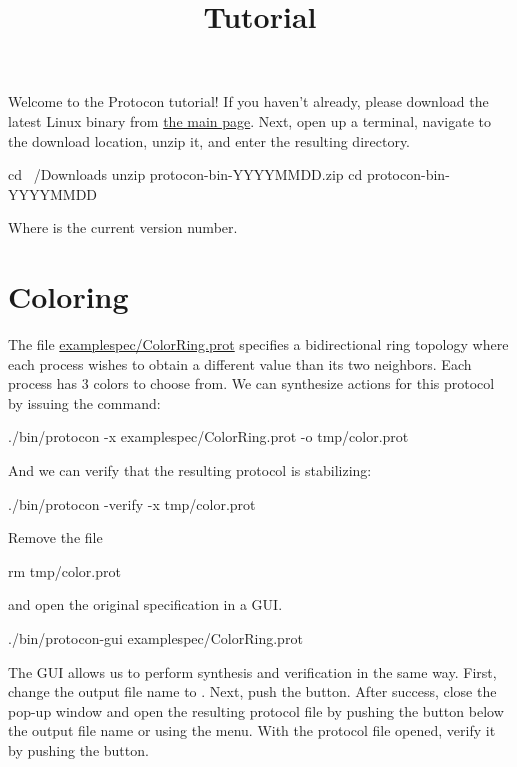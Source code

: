 
\title{Tutorial}
\date{}



Welcome to the Protocon tutorial!
If you haven't already, please download the latest Linux binary from \href{index.html}{the main page}.
Next, open up a terminal, navigate to the download location, unzip it, and enter the resulting directory.
\begin{code}
cd ~/Downloads
unzip protocon-bin-YYYYMMDD.zip
cd protocon-bin-YYYYMMDD
\end{code}
Where  is the current version number.


\tableofcontents


\section{Coloring}

The file \href{\examplespec/ColorRing.prot}{examplespec/ColorRing.prot} specifies a bidirectional ring topology where each process wishes to obtain a different value than its two neighbors.
Each process has $3$ colors to choose from.
We can synthesize actions for this protocol by issuing the command:
\begin{code}
./bin/protocon -x examplespec/ColorRing.prot -o tmp/color.prot
\end{code}
And we can verify that the resulting protocol is stabilizing:
\begin{code}
./bin/protocon -verify -x tmp/color.prot
\end{code}

Remove the file
\begin{code}
rm tmp/color.prot
\end{code}
and open the original specification in a GUI.
\begin{code}
./bin/protocon-gui examplespec/ColorRing.prot
\end{code}

The GUI allows us to perform synthesis and verification in the same way.
First, change the output file name to .
Next, push the  button.
After success, close the pop-up window and open the resulting protocol file by pushing the  button below the output file name or using the  menu.
With the protocol file opened, verify it by pushing the  button.

